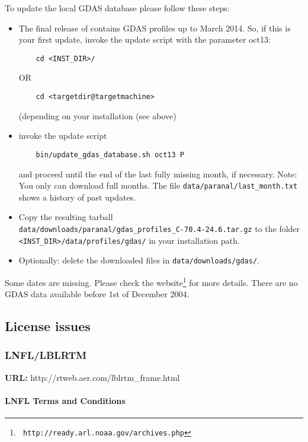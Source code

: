 To update the local GDAS database please follow these steps:
\begin{itemize}
    \item
The final release of \mf{} contains GDAS profiles up to March 2014.
So, if this is your first update, invoke the update script with the
parameter oct13:
\begin{verbatim}
    cd <INST_DIR>/
\end{verbatim}
OR
\begin{verbatim}
    cd <targetdir@targetmachine>
\end{verbatim}
(depending on your installation (see above)
\item invoke the update script
\begin{verbatim}
    bin/update_gdas_database.sh oct13 P
\end{verbatim}
and proceed until the end of the last fully missing month, if necessary. Note:
You only can download full months. The file
{\tt data/paranal/last\_month.txt} shows a history of past updates.
\item Copy the resulting tarball\\
{\tt data/downloads/paranal/gdas\_profiles\_C-70.4-24.6.tar.gz} to the folder
\\{\tt <INST\_DIR>/data/profiles/gdas/} in your \mf{} installation path.
\item Optionally: delete the downloaded files in {\tt data/downloads/gdas/}.
\end{itemize}
Some dates are missing. Please check the website\footnote{\tt
http://ready.arl.noaa.gov/archives.php} for more details. There are no GDAS
data available before 1st of December 2004.

\subsection{License issues}\label{app:licenses}
\subsubsection{LNFL/LBLRTM}
{\bf URL:} http://rtweb.aer.com/lblrtm\_frame.html

\paragraph*{LNFL Terms and Conditions}

